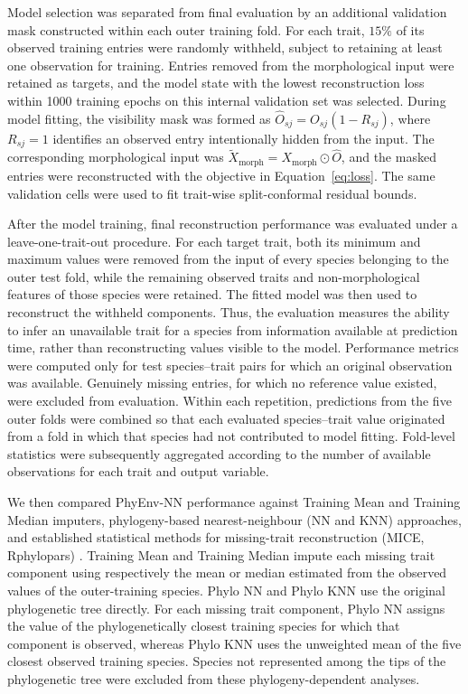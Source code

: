 \documentclass[preprint,12pt,authoryear]{elsarticle}
\newcommand{\awesomeModel}{PhyEnv-NN }
\begin{document}
Model selection was separated from final evaluation by an additional validation mask constructed within each outer training fold. For each trait, \(15\%\) of its observed training entries were randomly withheld, subject to retaining at least one observation for training. Entries removed from the morphological input were retained as targets, and the model state with the lowest reconstruction loss within 1000 training epochs on this internal validation set was selected.
During model fitting, the visibility mask was formed as \(\hat O_{sj}=O_{sj}(1-R_{sj})\), where $R_{sj}=1$ identifies an observed entry intentionally hidden from the input. The corresponding morphological input was $\widetilde{X}_{\mathrm{morph}}=X_{\mathrm{morph}}\odot\hat O$, and the masked entries were reconstructed with the objective in Equation~\ref{eq:loss}. The same validation cells were used to fit trait-wise split-conformal residual bounds.

After the model training, final reconstruction performance was evaluated under a leave-one-trait-out procedure. For each target trait, both its minimum and maximum values were removed from the input of every species belonging to the outer test fold, while the remaining observed traits and non-morphological features of those species were retained. The fitted model was then used to reconstruct the withheld components. Thus, the evaluation measures the ability to infer an unavailable trait for a species from information available at prediction time, rather than reconstructing values visible to the model. Performance metrics were computed only for test species--trait pairs for which an original observation was available. Genuinely missing entries, for which no reference value existed, were excluded from evaluation. Within each repetition, predictions from the five outer folds were combined so that each evaluated species--trait value originated from a fold in which that species had not contributed to model fitting. Fold-level statistics were subsequently aggregated according to the number of available observations for each trait and output variable.

We then compared \awesomeModel performance against Training Mean and Training Median imputers, phylogeny-based nearest-neighbour (NN and KNN) approaches, and established statistical methods for missing-trait reconstruction (MICE, Rphylopars) \citep{van2011mice, goolsby2017rphylopars}. Training Mean and Training Median impute each missing trait component using respectively the mean or median estimated from the observed values of the outer-training species. Phylo NN and Phylo KNN use the original phylogenetic tree directly. For each missing trait component, Phylo NN assigns the value of the phylogenetically closest training species for which that component is observed, whereas Phylo KNN uses the unweighted mean of the five closest observed training species. Species not represented among the tips of the phylogenetic tree were excluded from these phylogeny-dependent analyses.
\end{document}
